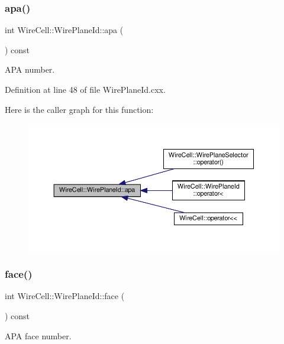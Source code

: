 \subsubsection{\texorpdfstring{apa()}{apa()}}
{\footnotesize\ttfamily int Wire\+Cell\+::\+Wire\+Plane\+Id\+::apa (\begin{DoxyParamCaption}{ }\end{DoxyParamCaption}) const}



A\+PA number. 



Definition at line 48 of file Wire\+Plane\+Id.\+cxx.

Here is the caller graph for this function\+:
\nopagebreak
\begin{figure}[H]
\begin{center}
\leavevmode
\includegraphics[width=350pt]{class_wire_cell_1_1_wire_plane_id_a868dff2296e2531a30732a0528054be2_icgraph}
\end{center}
\end{figure}
\mbox{\label{class_wire_cell_1_1_wire_plane_id_a18de55bd3637c1586db6ab9e5f39da18}} 
\subsubsection{\texorpdfstring{face()}{face()}}
{\footnotesize\ttfamily int Wire\+Cell\+::\+Wire\+Plane\+Id\+::face (\begin{DoxyParamCaption}{ }\end{DoxyParamCaption}) const}



A\+PA face number. 



